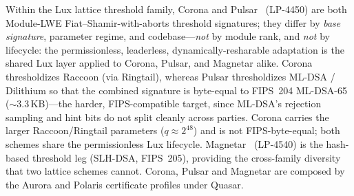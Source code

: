 Within the Lux lattice threshold family, Corona and Pulsar~\cite{pulsar} (LP-4450) are
both Module-LWE Fiat--Shamir-with-aborts threshold signatures; they differ by \emph{base
signature}, parameter regime, and codebase---\emph{not} by module rank, and \emph{not} by
lifecycle: the permissionless, leaderless, dynamically-resharable adaptation is the shared
Lux layer applied to Corona, Pulsar, and Magnetar alike. Corona thresholdizes Raccoon (via
Ringtail), whereas Pulsar thresholdizes ML-DSA / Dilithium so that the combined signature
is byte-equal to FIPS~204 ML-DSA-65 ($\sim$3.3\,KB)---the harder, FIPS-compatible target,
since ML-DSA's rejection sampling and hint bits do not split cleanly across parties. Corona
carries the larger Raccoon/Ringtail parameters ($q \approx 2^{48}$) and is not
FIPS-byte-equal; both schemes share the permissionless Lux lifecycle.
Magnetar~\cite{magnetar} (LP-4540) is the hash-based threshold leg (SLH-DSA, FIPS~205),
providing the cross-family diversity that two lattice schemes cannot. Corona, Pulsar and
Magnetar are composed by the Aurora and Polaris certificate profiles under Quasar.

